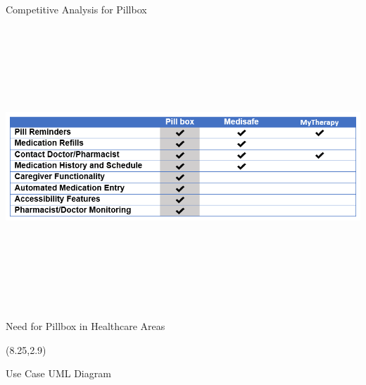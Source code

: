 \documentclass[22pt]{beamer}
\begin{document}
\begin{frame}[fragile]
\begin{textblock}{7.25}
\begin{block}{Competitive Analysis for Pillbox}
\begin{center}
\includegraphics[height=10.5cm]{CompetitiveAdvantage.png}
\end{center}
\end{block}

\begin{block}{Need for Pillbox in Healthcare Areas}

\end{block}

\end{textblock}



\begin{textblock}{7.25}(8.25,2.9)

\begin{block}{Use Case UML Diagram}


\end{block}
\end{textblock}
\end{frame}
\end{document}
